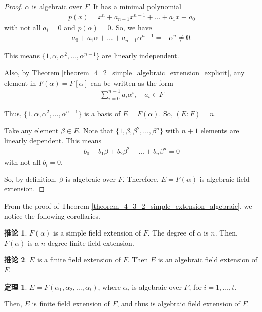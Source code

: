 \documentclass[utf8]{ctexbook}
\theoremstyle{definition}
\newtheorem{prototheorem}{定理}[section]
\newenvironment{theorem}
   {\colorlet{shadecolor}{red!30}\begin{shaded}\begin{prototheorem}}
   {\end{prototheorem}\end{shaded}}
\newtheorem{corollary}{推论}[section]
\begin{document}
\begin{proof}
$\alpha$ is algebraic over $F$. It has a minimal polynomial
\begin{align*}
p(x) = x^n + a_{n-1} x^{n-1} + \ldots + a_1 x + a_0
\end{align*}
with not all $a_i = 0$ and $p(\alpha)=0$. So, we have
\begin{align*}
a_0 + a_1 \alpha + \ldots + a_{n-1} \alpha^{n-1} = - \alpha^n \neq 0 .
\end{align*}

This means $\{ 1, \alpha, \alpha^2, \ldots, \alpha^{n-1} \}$ are linearly independent.

Also, by Theorem \ref{theorem_4_2_simple_algebraic_extension_explicit}, any element in $F(\alpha) = F[\alpha]$ can be written as the form
\begin{align*}
\sum_{i=0} ^{n-1} a_i \alpha^i, \quad a_i \in F
\end{align*}

Thus, $\{ 1, \alpha, \alpha^2, \ldots, \alpha^{n-1} \}$  is a basis of $E = F(\alpha)$. So, $(E:F)=n$.

Take any element $\beta \in E$. Note that $\{ 1, \beta, \beta^2, \ldots, \beta^n \}$ with $n+1$ elements are linearly dependent. This means
\begin{align*}
b_0 + b_1 \beta + b_2 \beta^2 + \ldots + b_n \beta^n = 0
\end{align*}
with not all $b_i =0$.

So, by definition, $\beta$ is algebraic over $F$. Therefore, $E=F(\alpha)$ is algebraic field extension.

\end{proof}


From the proof of Theorem \ref{theorem_4_3_2_simple_extension_algebraic}, we notice the following corollaries.

\begin{corollary}\label{corollary_4_3_2_simple_extension_algebraic}
$F(\alpha)$ is a simple field extension of $F$. The degree of $\alpha$ is $n$. Then, $F(\alpha)$ is a $n$ degree finite field extension.
\end{corollary}

\begin{corollary}\label{corollary_4_3_3_simple_extension_algebraic}
$E$ is a finite field extension of $F$. Then $E$ is an algebraic field extension of $F$.
\end{corollary}


\begin{theorem}
\label{theorem_4_3_3_finite_extension_algebraic}
$E = F(\alpha_1, \alpha_2, \ldots, \alpha_t)$, where $\alpha_i$ is algebraic over $F$, for $i=1, \ldots, t$.

Then, $E$ is finite field extension of $F$, and thus is algebraic field extension of $F$.
\end{theorem}
\end{document}
